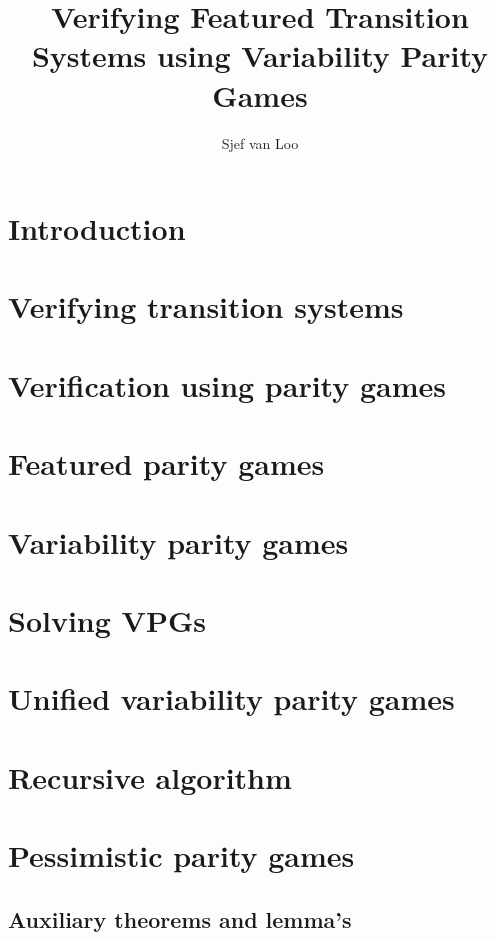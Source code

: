 \documentclass[]{article}
\title{Verifying Featured Transition Systems using Variability Parity Games}
\author{Sjef van Loo}
\begin{document}
\maketitle

\tableofcontents

\section{Introduction}


\section{Verifying transition systems}


\section{Verification using parity games}


\section{Featured parity games}


\section{Variability parity games}


\section{Solving VPGs}


\section{Unified variability parity games}
\label{sec_unified_pg}


\section{Recursive algorithm}


\section{Pessimistic parity games}


\begin{appendices}
\section{Auxiliary theorems and lemma's}
\label{appendix:proves}

\end{appendices}

 

\end{document}
